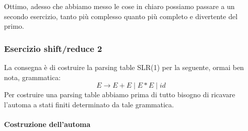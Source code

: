 \documentclass[class=book, crop=false, oneside, 12pt]{standalone}
\begin{document}
Ottimo, adesso che abbiamo messo le cose in chiaro possiamo passare a un secondo esercizio, tanto più complesso quanto più completo e divertente del primo.

\subsubsection{Esercizio shift/reduce 2}
La consegna è di costruire la parsing table SLR(1) per la seguente, ormai ben nota, grammatica:
\begin{equation}
    \label{eq:ex2-sh/re-grammar}
    E \to E+E \mid E*E \mid id
\end{equation} 
Per costruire una parsing table abbiamo prima di tutto bisogno di ricavare l'automa a stati finiti determinato da tale grammatica.
\paragraph{Costruzione dell'automa}
\end{document}
